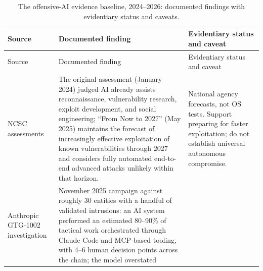 \documentclass[
  english,
  9pt,
]{extarticle}
\begin{document}
\begin{longtable}[]{@{}
  >{\raggedright\arraybackslash}p{}
  >{\raggedright\arraybackslash}p{}
  >{\raggedright\arraybackslash}p{}@{}}
\caption{The offensive-AI evidence baseline, 2024--2026: documented
findings with evidentiary status and
caveats.}\label{tbl:offensive_evidence}\tabularnewline
\toprule\noalign{}
\begin{minipage}[b]{\linewidth}\raggedright
Source
\end{minipage} & \begin{minipage}[b]{\linewidth}\raggedright
Documented finding
\end{minipage} & \begin{minipage}[b]{\linewidth}\raggedright
Evidentiary status and caveat
\end{minipage} \\
\midrule\noalign{}
\endfirsthead
\toprule\noalign{}
\begin{minipage}[b]{\linewidth}\raggedright
Source
\end{minipage} & \begin{minipage}[b]{\linewidth}\raggedright
Documented finding
\end{minipage} & \begin{minipage}[b]{\linewidth}\raggedright
Evidentiary status and caveat
\end{minipage} \\
\midrule\noalign{}
\endhead
\bottomrule\noalign{}
\endlastfoot
NCSC assessments \citep{ncsc_ai_threat_2024, ncsc_ai_cyber_threat} & The
original assessment (January 2024) judged AI already assists
reconnaissance, vulnerability research, exploit development, and social
engineering; ``From Now to 2027'' (May 2025) maintains the forecast of
increasingly effective exploitation of known vulnerabilities through
2027 and considers fully automated end-to-end advanced attacks unlikely
within that horizon. & National agency forecasts, not OS tests. Support
preparing for faster exploitation; do not establish universal autonomous
compromise. \\
Anthropic GTG-1002 investigation \citep{anthropic_campaign_report} &
November 2025 campaign against roughly 30 entities with a handful of
validated intrusions: an AI system performed an estimated 80--90\% of
tactical work orchestrated through Claude Code and MCP-based tooling,
with 4--6 human decision points across the chain; the model overstated

\end{longtable}
\end{document}
